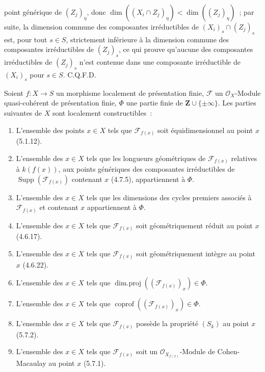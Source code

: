
point générique de $(Z_j)_\eta$, donc
$\dim((X_i\cap Z_j)_\eta)<\dim((Z_j)_\eta)$~; par suite, la dimension commune
des composantes irréductibles de $(X_i)_s\cap(Z_j)_s$ est, pour tout $s\in S$,
strictement inférieure à la dimension commune des composantes irréductibles de
$(Z_j)_s$, ce qui prouve qu'aucune des composantes irréductibles de $(Z_j)_s$
n'est contenue dans une composante irréductible de $(X_i)_s$ pour $s\in S$.
C.Q.F.D.

\begin{proposition}[9.9.2]
\label{IV.9.9.2-fr}
Soient $f:X\to S$ un morphisme localement de présentation finie, $\mathcal F$
un $\mathcal O_X$-Module quasi-cohérent de présentation finie, $\Phi$ une
partie finie de $\mathbf Z\cup\{\pm\infty\}$. Les parties suivantes de $X$
sont localement constructibles~:
\begin{enumerate}
\item[(i)] L'ensemble des points $x\in X$ tels que $\mathcal F_{f(x)}$ soit
équidimensionnel au point $x$ (5.1.12).
\item[(ii)] L'ensemble des $x\in X$ tels que les longueurs géométriques de
$\mathcal F_{f(x)}$ relatives à $k(f(x))$, aux points génériques des composantes
irréductibles de $\operatorname{Supp}(\mathcal F_{f(x)})$ contenant $x$
(4.7.5), appartiennent à $\Phi$.
\item[(iii)] L'ensemble des $x\in X$ tels que les dimensions des cycles
premiers associés à $\mathcal F_{f(x)}$ et contenant $x$ appartiennent à
$\Phi$.
\item[(iv)] L'ensemble des $x\in X$ tels que $\mathcal F_{f(x)}$ soit
géométriquement réduit au point $x$ (4.6.17).
\item[(v)] L'ensemble des $x\in X$ tels que $\mathcal F_{f(x)}$ soit
géométriquement intègre au point $x$ (4.6.22).
\item[(vi)] L'ensemble des $x\in X$ tels que
$\operatorname{dim.proj}((\mathcal F_{f(x)})_x)\in\Phi$.
\item[(vii)] L'ensemble des $x\in X$ tels que
$\operatorname{coprof}((\mathcal F_{f(x)})_x)\in\Phi$.
\item[(viii)] L'ensemble des $x\in X$ tels que $\mathcal F_{f(x)}$ possède la
propriété $(S_k)$ au point $x$ (5.7.2).
\item[(ix)] L'ensemble des $x\in X$ tels que $\mathcal F_{f(x)}$ soit un
$\mathcal O_{X_{f(x)}}$-Module de Cohen-Macaulay au point $x$ (5.7.1).
\end{enumerate}
\end{proposition}

